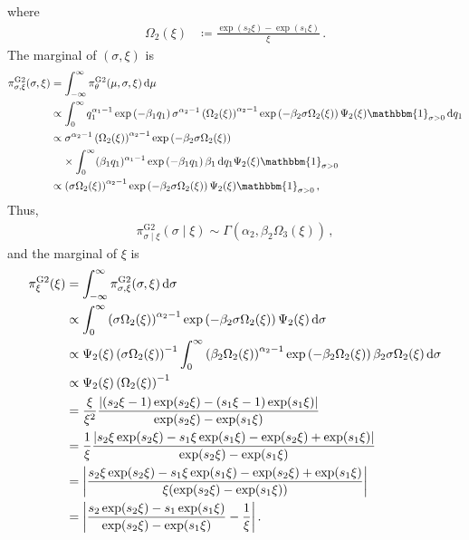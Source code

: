 \documentclass{article}
\DeclarePairedDelimiter\abs{\lvert}{\rvert}
\newcommand{\dd}{{\rm d}}
\begin{document}
%
where
%
\begin{align*}
	\Omega_2(\xi) &\coloneqq \frac{\exp(s_{2} \xi)
		- \exp(s_{1} \xi)}{\xi} \,.
\end{align*}
%
The marginal of $(\sigma, \xi)$ is
%
\begin{align}
	\pi ^ {\text{G2}}_{\sigma, \xi}(\sigma, \xi)
		&= \int_{-\infty}^\infty \pi_{\theta}^{\text{G2}}(\mu, \sigma, \xi)
		\, \dd \mu \nonumber \\
	&\propto \int_{0}^\infty q_1 ^ {\alpha_1 - 1} \exp\left(-\beta_1 q_1\right)
		\sigma^{\alpha_2 - 1} \left(\Omega_2(\xi)\right) ^ {\alpha_2 - 1}
		\exp\left(-\beta_2 \sigma \Omega_2(\xi)\right) \Psi_2(\xi)
		\mathbbm{1}_{\sigma > 0} \, \dd q_1 \nonumber \\
	&\propto \sigma ^ {\alpha_2 - 1}
		\left(\Omega_2(\xi)\right) ^ {\alpha_2 - 1}
		\exp\left(-\beta_2 \sigma \Omega_2(\xi)\right) \nonumber \\
	&\ \phantom{=} \times \int_{0}^\infty (\beta_1 q_1) ^ {\alpha_1 - 1}
		\exp\left(-\beta_1 q_1\right) \beta_1 \, \dd q_1
		\Psi_2(\xi) \mathbbm{1}_{\sigma > 0} \nonumber \\
	&\propto \left(\sigma \Omega_2(\xi)\right) ^ {\alpha_2 - 1}
		\exp\left(-\beta_2 \sigma \Omega_2(\xi)\right)
		\Psi_2(\xi) \mathbbm{1}_{\sigma > 0} \label{eq:g2-xi-sigma} \,,
\end{align}
%
Thus,
%
\begin{align*}
	\pi ^ {\text{G2}}_{\sigma \mid \xi}(\sigma \mid \xi)
		\sim \Gamma(\alpha_2, \beta_2 \Omega_3(\xi)) \,,
\end{align*}
%
and the marginal of $\xi$ is
%
\begin{align*}
	\pi ^ {\text{G2}}_\xi(\xi)
		&= \int_{-\infty}^\infty \pi^{\text{G2}}_{\sigma, \xi}(\sigma, \xi)
		\, \dd \sigma \\
	&\propto \int_{0}^\infty \left(\sigma \Omega_2(\xi)\right) ^ {\alpha_2 - 1}
		\exp\left(-\beta_2 \sigma \Omega_2(\xi)\right)
		\Psi_2(\xi) \, \dd \sigma \\
	&\propto \Psi_2(\xi) \left(\sigma \Omega_2(\xi)\right) ^ {-1}
		\int_{0}^\infty \left(\beta_2 \Omega_2(\xi)\right)
		^ {\alpha_2 - 1}
		\exp\left(-\beta_2 \Omega_2(\xi)\right)
		\beta_2 \sigma \Omega_2(\xi)
		 \, \dd \sigma \\
	&\propto \Psi_2(\xi) \left( \Omega_2(\xi)\right) ^ {-1} \\
	&= \frac{\xi}{\xi ^ {2}}
		\frac{\abs*{(s_2 \xi - 1) \exp(s_2 \xi) - (s_1 \xi - 1) \exp(s_1 \xi)}}
		{\exp(s_{2} \xi) - \exp(s_{1} \xi)} \\
	&= \frac{1}{\xi}
		\frac{\abs*{s_2 \xi \exp(s_2 \xi) - s_1 \xi \exp(s_1 \xi)
		- \exp(s_2 \xi) +  \exp(s_1 \xi)}}
		{\exp(s_{2} \xi) - \exp(s_{1} \xi)} \\
	&= \abs*{\frac{s_2 \xi \exp(s_2 \xi) - s_1 \xi \exp(s_1 \xi)
		- \exp(s_2 \xi) +  \exp(s_1 \xi)}
		{\xi(\exp(s_{2} \xi) - \exp(s_{1} \xi))}} \\
	&= \abs*{\frac{s_2 \exp(s_2 \xi) - s_1 \exp(s_1 \xi)}
		{\exp(s_{2} \xi) - \exp(s_{1} \xi)}
		- \frac{1}{\xi}} \,.
\end{align*}
\end{document}
